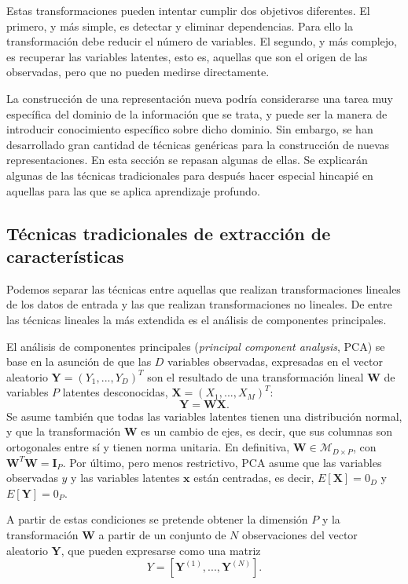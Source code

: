 Estas transformaciones pueden intentar cumplir dos objetivos diferentes. El primero, y más simple, es detectar y eliminar dependencias. Para ello la transformación debe reducir el número de variables. El segundo, y más complejo, es recuperar las variables latentes, esto es, aquellas que son el origen de las observadas, pero que no pueden medirse directamente.

La construcción de una representación nueva podría considerarse una tarea muy específica del dominio de la información que se trata, y puede ser la manera de introducir conocimiento específico sobre dicho dominio. Sin embargo, se han desarrollado gran cantidad de técnicas genéricas para la construcción de nuevas representaciones.
En esta sección se repasan algunas de ellas. Se explicarán algunas de las técnicas tradicionales para después hacer especial hincapié en aquellas para las que se aplica aprendizaje profundo.

\subsection{Técnicas tradicionales de extracción de características}

Podemos separar las técnicas entre aquellas que realizan transformaciones lineales de los datos de entrada y las que realizan transformaciones no lineales. De entre las técnicas lineales la más extendida es el análisis de componentes principales.


El análisis de componentes principales (\textit{principal component analysis}, PCA) se base en la asunción de que las $D$ variables observadas, expresadas en el vector aleatorio $\textbf{Y} = (Y_1,...,Y_D)^T$ son el resultado de una transformación lineal $\textbf{W}$ de variables $P$ latentes desconocidas, $\textbf{X} = (X_1,...,X_M)^T$: $$\textbf{Y} = \textbf{W}\textbf{X}.$$ Se asume también que todas las variables latentes tienen una distribución normal, y que la transformación $\textbf{W}$ es un cambio de ejes, es decir, que sus columnas son ortogonales entre sí y tienen norma unitaria. En definitiva, $\textbf{W} \in \mathcal{M}_{D \times P}$, con $\textbf{W}^T\textbf{W} = \textbf{I}_P$. Por último, pero menos restrictivo, PCA asume que las variables observadas ${y}$ y las variables latentes $\textbf{x}$ están centradas, es decir, $E[\textbf{X}] = 0_D$ y $E[\textbf{Y}] = 0_P$.

A partir de estas condiciones se pretende obtener la dimensión $P$ y la transformación $\textbf{W}$ a partir de un conjunto de $N$ observaciones del vector aleatorio $\textbf{Y}$, que pueden expresarse como una matriz $$Y = [\textbf{Y}^{(1)},...,\textbf{Y}^{(N)}].$$

